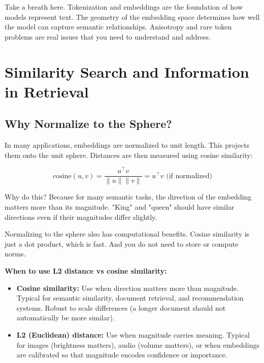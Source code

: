 \vspace{2em}

Take a breath here. Tokenization and embeddings are the foundation of how models represent text. The geometry of the embedding space determines how well the model can capture semantic relationships. Anisotropy and rare token problems are real issues that you need to understand and address.

\vspace{2em}

\section{Similarity Search and Information in Retrieval}

\subsection{Why Normalize to the Sphere?}

In many applications, embeddings are normalized to unit length. This projects them onto the unit sphere. Distances are then measured using cosine similarity:

\begin{equation}
\text{cosine}(u, v) = \frac{u^\top v}{\|u\| \|v\|} = u^\top v \text{ (if normalized)}
\end{equation}

Why do this? Because for many semantic tasks, the direction of the embedding matters more than its magnitude. "King" and "queen" should have similar directions even if their magnitudes differ slightly.

\vspace{1em}

Normalizing to the sphere also has computational benefits. Cosine similarity is just a dot product, which is fast. And you do not need to store or compute norms.

\vspace{1em}

\textbf{When to use L2 distance vs cosine similarity:}

\begin{itemize}
\item \textbf{Cosine similarity:} Use when direction matters more than magnitude. Typical for semantic similarity, document retrieval, and recommendation systems. Robust to scale differences (a longer document should not automatically be more similar).

\item \textbf{L2 (Euclidean) distance:} Use when magnitude carries meaning. Typical for images (brightness matters), audio (volume matters), or when embeddings are calibrated so that magnitude encodes confidence or importance.
\end{itemize}

